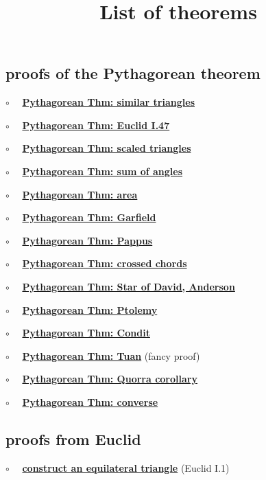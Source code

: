 \documentclass[11pt, oneside]{article}
\title{List of theorems}
\date{}
\begin{document}
\maketitle
\Large


\subsection*{proofs of the Pythagorean theorem}

$\circ$ \ \ \hyperref[sec:Pythagoras_similar_triangles]{\textbf{Pythagorean Thm:  similar triangles}}

$\circ$ \ \ \hyperref[sec:Euclid47]{\textbf{Pythagorean Thm: Euclid I.47 }}

$\circ$ \ \ \hyperref[sec:Pythagoras_scaled_triangles]{\textbf{Pythagorean Thm:  scaled triangles}}

$\circ$ \ \ \hyperref[sec:pthm_sum_angles]{\textbf{Pythagorean Thm:  sum of angles}}

$\circ$ \ \ \hyperref[sec:Pythagoras_area]{\textbf{Pythagorean Thm:  area}}

$\circ$ \ \ \hyperref[sec:Garfield]{\textbf{Pythagorean Thm: Garfield }}

$\circ$ \ \ \hyperref[sec:PProof_Pappus]{\textbf{Pythagorean Thm:  Pappus}}

$\circ$ \ \ \hyperref[sec:PProof_chords]{\textbf{Pythagorean Thm:  crossed chords}}

$\circ$ \ \ \hyperref[sec:star_of_david]{\textbf{Pythagorean Thm:  Star of David, Anderson}}

$\circ$ \ \ \hyperref[sec:PProof_Ptolemy]{\textbf{Pythagorean Thm: Ptolemy }}

$\circ$ \ \ \hyperref[sec:Condit]{\textbf{Pythagorean Thm:  Condit}}

$\circ$ \ \ \hyperref[sec:Pthm_Tuan]{\textbf{Pythagorean Thm:  Tuan}} (fancy proof)

$\circ$ \ \ \hyperref[sec:Quorra]{\textbf{Pythagorean Thm:  Quorra corollary}}

$\circ$ \ \ \hyperref[sec:Pythagorean_theorem_converse]{\textbf{Pythagorean Thm:  converse}}


\subsection*{proofs from Euclid}

$\circ$ \ \ \hyperref[sec:Euclid1]{\textbf{construct an equilateral triangle}} (Euclid I.1)
\end{document}
